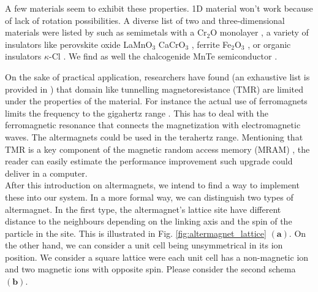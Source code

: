 \documentclass[../main.tex]{main.tex}
\begin{document}

A few materials seem to exhibit these properties. 1D material won't work because of lack of rotation possibilities. A diverse list of two and three-dimensional 
materials were listed by \cite{Smejkal2022} such as semimetals with a Cr$_2$O monolayer \cite{Chen_2023}, a variety of insulators like 
 perovskite oxide LaMnO$_3$ \cite{Yuan2021} CaCrO$_3$ \cite{Naka2021}, ferrite  Fe$_2$O$_3$ \cite{Smejkal2022_2}, or organic insulators $\kappa$-Cl \cite{Naka2019}.
We find as well the chalcogenide MnTe semiconductor \cite{Smejkal2022_2}.

On the sake of practical application, researchers have found (an exhaustive list is provided in \cite{Mazin2024}) that
domain like tunnelling magnetoresistance (TMR) are limited under the properties of the material. For instance the actual use 
of ferromagnets limits the frequency to the gigahertz range \cite{Mazin2024}.
This has to deal with the ferromagnetic resonance that connects 
the magnetization with electromagnetic waves. The altermagnets could be used in the terahertz range.
Mentioning that TMR is a key component of the magnetic random access memory (MRAM) \cite{OSullivan2004}\cite{Yadav2022}, the reader can easily estimate the performance
improvement such upgrade could deliver in a computer.\\
 
After this introduction on altermagnets, we intend to find a way to implement these into our system. In a more formal way, we can
distinguish two types of altermagnet.
In the first type, the altermagnet's lattice site have different distance to the neighbours depending on the linking axis and the 
spin of the particle in the site. This is illustrated in Fig. \ref{fig:altermagnet_lattice} $(\bm{a})$. On the other hand, we can consider a unit cell being unsymmetrical
in its ion position. We consider a square lattice were each unit cell has a non-magnetic ion and two magnetic ions with opposite spin.
Please consider the second schema $(\bm{b})$.\\
\end{document}
